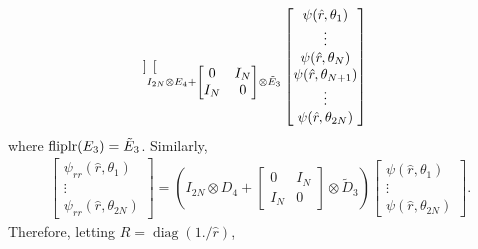 \begin{align*}
{\begin{bmatrix}
 \end{bmatrix}
 }_{I_{2N} \otimes E_4 +                                                                        
    \begin{bmatrix} 0 & I_N \\ I_N & 0\end{bmatrix}                                             
    \otimes \tilde{E}_3}
 \begin{bmatrix}
  \psi(\hat{r},\theta_1) \\
    \vdots                 \\
  \psi(\hat{r},\theta_N) \\
  \psi(\hat{r},\theta_{N+1}) \\
    \vdots                 \\
  \psi(\hat{r},\theta_{2N}) \\
 \end{bmatrix}
\end{align*}
where $\operatorname{fliplr}(E_3) = \tilde{E}_3$.
Similarly,
\begin{align*}
 \begin{bmatrix}
  \psi_{rr}(\hat{r},\theta_1) \\ \vdots \\
  \psi_{rr}(\hat{r},\theta_{2N})
 \end{bmatrix}
 =
 \left( I_{2N} \otimes D_4 +
 \begin{bmatrix} 0 & I_N \\ I_N & 0\end{bmatrix}
 \otimes \tilde{D}_3 \right)
 \begin{bmatrix}
  \psi(\hat{r},\theta_1) \\ \vdots \\ \psi(\hat{r},\theta_{2N})
 \end{bmatrix}.
\end{align*}
Therefore, letting $R = \operatorname{diag}(1./\hat{r})$,
